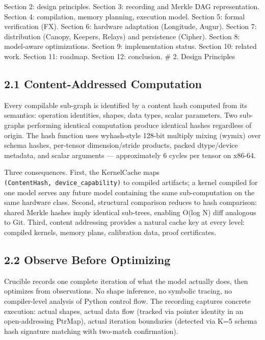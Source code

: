 Section 2: design principles. Section 3: recording and Merkle DAG representation. Section 4: compilation, memory planning, execution model. Section 5: formal verification (FX). Section 6: hardware adaptation (Longitude, Augur). Section 7: distribution (Canopy, Keepers, Relays) and persistence (Cipher). Section 8: model-aware optimizations. Section 9: implementation status. Section 10: related work. Section 11: roadmap. Section 12: conclusion.
\# 2. Design Principles

\subsection{2.1 Content-Addressed Computation}\label{content-addressed-computation}

Every compilable sub-graph is identified by a content hash computed from its semantics: operation identities, shapes, data types, scalar parameters. Two sub-graphs performing identical computation produce identical hashes regardless of origin. The hash function uses wyhash-style 128-bit multiply mixing (wymix) over schema hashes, per-tensor dimension/stride products, packed dtype/device metadata, and scalar arguments --- approximately 6 cycles per tensor on x86-64.

Three consequences. First, the KernelCache maps \texttt{(ContentHash,\ device\_capability)} to compiled artifacts; a kernel compiled for one model serves any future model containing the same sub-computation on the same hardware class. Second, structural comparison reduces to hash comparison: shared Merkle hashes imply identical sub-trees, enabling O(log N) diff analogous to Git. Third, content addressing provides a natural cache key at every level: compiled kernels, memory plans, calibration data, proof certificates.

\subsection{2.2 Observe Before Optimizing}\label{observe-before-optimizing}

Crucible records one complete iteration of what the model actually does, then optimizes from observations. No shape inference, no symbolic tracing, no compiler-level analysis of Python control flow. The recording captures concrete execution: actual shapes, actual data flow (tracked via pointer identity in an open-addressing PtrMap), actual iteration boundaries (detected via K=5 schema hash signature matching with two-match confirmation).

